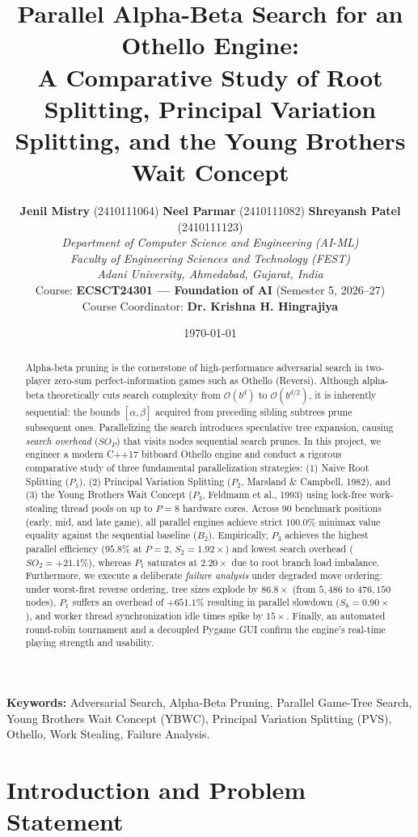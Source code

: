 \documentclass[11pt,a4paper]{article}
\title{\textbf{Parallel Alpha-Beta Search for an Othello Engine:}\\ \Large A Comparative Study of Root Splitting, Principal Variation Splitting, and the Young Brothers Wait Concept}
\author{
  \textbf{Jenil Mistry} (2410111064) \quad
  \textbf{Neel Parmar} (2410111082) \quad
  \textbf{Shreyansh Patel} (2410111123)\\[0.5em]
  \textit{Department of Computer Science and Engineering (AI-ML)}\\
  \textit{Faculty of Engineering Sciences and Technology (FEST)}\\
  \textit{Adani University, Ahmedabad, Gujarat, India}\\[0.5em]
  Course: \textbf{ECSCT24301 --- Foundation of AI} (Semester 5, 2026--27)\\
  Course Coordinator: \textbf{Dr. Krishna H. Hingrajiya}
}
\date{\today}
\begin{document}
\maketitle

\begin{abstract}
Alpha-beta pruning is the cornerstone of high-performance adversarial search in two-player zero-sum perfect-information games such as Othello (Reversi). Although alpha-beta theoretically cuts search complexity from $\mathcal{O}(b^d)$ to $\mathcal{O}(b^{d/2})$, it is inherently sequential: the bounds $[\alpha, \beta]$ acquired from preceding sibling subtrees prune subsequent ones. Parallelizing the search introduces speculative tree expansion, causing \textit{search overhead} ($SO_P$) that visits nodes sequential search prunes. In this project, we engineer a modern C++17 bitboard Othello engine and conduct a rigorous comparative study of three fundamental parallelization strategies: (1) Naive Root Splitting ($P_1$), (2) Principal Variation Splitting ($P_2$, Marsland \& Campbell, 1982), and (3) the Young Brothers Wait Concept ($P_3$, Feldmann et al., 1993) using lock-free work-stealing thread pools on up to $P=8$ hardware cores. Across 90 benchmark positions (early, mid, and late game), all parallel engines achieve strict $100.0\%$ minimax value equality against the sequential baseline ($B_2$). Empirically, $P_3$ achieves the highest parallel efficiency ($95.8\%$ at $P=2$, $S_2 = 1.92\times$) and lowest search overhead ($SO_2 = +21.1\%$), whereas $P_1$ saturates at $2.20\times$ due to root branch load imbalance. Furthermore, we execute a deliberate \textit{failure analysis} under degraded move ordering: under worst-first reverse ordering, tree sizes explode by $86.8\times$ (from $5,486$ to $476,150$ nodes), $P_1$ suffers an overhead of $+651.1\%$ resulting in parallel slowdown ($S_8 = 0.90\times$), and worker thread synchronization idle times spike by $15\times$. Finally, an automated round-robin tournament and a decoupled Pygame GUI confirm the engine's real-time playing strength and usability.
\end{abstract}

\vspace{0.5em}
\noindent\textbf{Keywords:} Adversarial Search, Alpha-Beta Pruning, Parallel Game-Tree Search, Young Brothers Wait Concept (YBWC), Principal Variation Splitting (PVS), Othello, Work Stealing, Failure Analysis.

\section{Introduction and Problem Statement}
\label{sec:intro}
\end{document}
